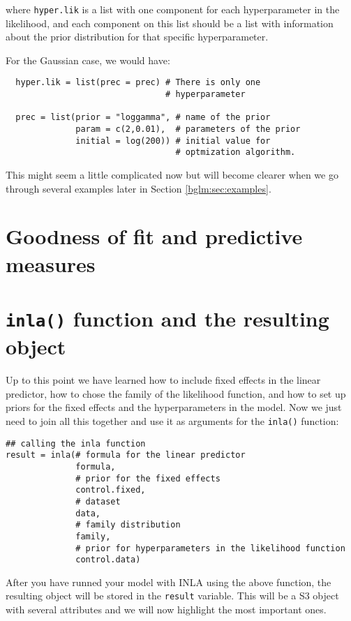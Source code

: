 \documentclass[a4paper,11pt]{report}
\newcommand{\tv}{\texttt}
\begin{document}
\begin{enumerate}
    where \texttt{hyper.lik} is a list with one component for each
    hyperparameter in the likelihood, and each component on this list
    should be a list with information about the prior distribution for
    that specific hyperparameter.
 
    For the Gaussian case, we would have:
    
\begin{verbatim}
  hyper.lik = list(prec = prec) # There is only one
                                # hyperparameter

  prec = list(prior = "loggamma", # name of the prior
              param = c(2,0.01),  # parameters of the prior
              initial = log(200)) # initial value for 
                                  # optmization algorithm.
\end{verbatim}
    
    This might seem a little complicated now but will become clearer
    when we go through several examples later in Section
    \ref{bglm:sec:examples}.
    
\end{enumerate}

\section{Goodness of fit and predictive measures}

\section{\tv{inla()} function and the resulting object}

Up to this point we have learned how to include fixed effects in the
linear predictor, how to chose the family of the likelihood function,
and how to set up priors for the fixed effects and the hyperparameters
in the model. Now we just need to join all this together and use it as
arguments for the \tv{inla()} function:

\begin{verbatim}
## calling the inla function
result = inla(# formula for the linear predictor
              formula,
              # prior for the fixed effects
              control.fixed,
              # dataset
              data,
              # family distribution
              family,
              # prior for hyperparameters in the likelihood function
              control.data)
\end{verbatim}

After you have runned your model with INLA using the above function,
the resulting object will be stored in the \tv{result} variable. This
will be a S3 object with several attributes and we will now highlight
the most important ones.
\end{document}
